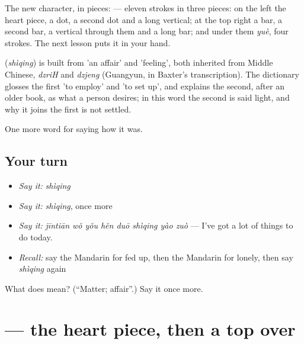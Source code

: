 The new character, in pieces:  — eleven strokes in three pieces: on the left the heart piece, a dot, a second dot and a long vertical; at the top right a bar, a second bar, a vertical through them and a long bar; and under them  \emph{yuè}, four strokes. The next lesson puts it in your hand.

\begin{cousinweb}
\textbf{} (\emph{shìqing}) is built from  'an affair' and  'feeling', both inherited from Middle Chinese, \emph{dzriH} and \emph{dzjeng} (Guangyun, in Baxter's transcription). The dictionary glosses the first 'to employ' and 'to set up', and explains the second, after an older book, as what a person desires; in this word the second is said light, and why it joins the first is not settled.
\end{cousinweb}

\begin{grammarlens}[title={What you've built}]
One more word for saying how it was.
\end{grammarlens}

\subsection*{Your turn}
\begin{itemize}
\raggedright
  \item \emph{Say it:} \emph{shìqing}
  \item \emph{Say it:} \emph{shìqing}, once more
  \item \emph{Say it:} \emph{jīntiān wǒ yǒu hěn duō shìqing yào zuò} — I've got a lot of things to do today.
  \item \emph{Recall:} say the Mandarin for fed up, then the Mandarin for lonely, then say \emph{shìqing} again
\end{itemize}

\begin{tcolorbox}[breakable,colback=teal!4,colframe=teal!35!black,title={Before you move on}]
What does  mean? (\textquotedblleft{}Matter; affair\textquotedblright{}.) Say it once more.
\end{tcolorbox}
\section[\texorpdfstring{\zh{情} (qíng)}{情 (qíng)}]{ — the heart piece, then a top over }

\label{lesson:ZH-W459-qing-feeling}



